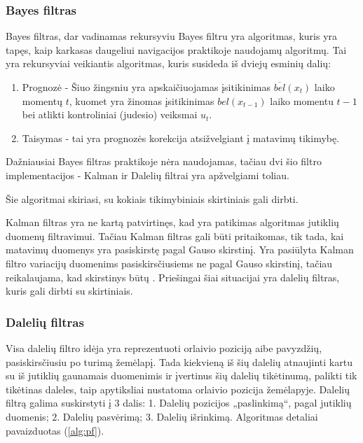 \documentclass[a4paper,12pt]{article}
\begin{document}
		\subsubsection{Bayes filtras}
		\label{sec:BayesFilter}
		
		Bayes filtras, dar vadinamas rekursyviu Bayes filtru yra algoritmas, kuris yra tapęs, kaip karkasas daugeliui navigacijos praktikoje naudojamų algoritmų. 
		Tai yra rekursyviai veikiantis algoritmas, kuris susideda iš dviejų esminių dalių:
		\begin{enumerate}
			\item Prognozė - Šiuo žingsniu yra apskaičiuojamas įsitikinimas $\overline{bel}(x_t)$ laiko momentų $t$, kuomet yra žinomas įsitikinimas $bel(x_{t-1})$ laiko momentu $t-1$ bei atlikti kontroliniai (judesio) veiksmai $u_t$.
			\item Taisymas - tai yra prognozės korekcija atsižvelgiant į matavimų tikimybę.
		\end{enumerate}
		
		Dažniausiai Bayes filtras praktikoje nėra naudojamas, tačiau dvi šio filtro implementacijos - Kalman \cite{siegwart2011introduction, thrun2005probabilistic} ir Dalelių filtrai \cite{Gustafsson2010} yra apžvelgiami toliau.
		
		Šie algoritmai skiriasi, su kokiais tikimybiniais skirtiniais gali dirbti.	
				
		Kalman filtras yra ne kartą patvirtinęs, kad yra patikimas algoritmas jutiklių duomenų filtravimui. Tačiau Kalman filtras gali būti pritaikomas, tik tada, kai matavimų duomenys yra pasiskirstę pagal Gauso skirstinį. Yra pasiūlyta \cite{JulierUhlmann2004} Kalman filtro variacijų duomenims pasiskirsčiusiems ne pagal Gauso skirstinį, tačiau reikalaujama, kad skirstinys būtų . Priešingai šiai situacijai yra dalelių filtras, kuris gali dirbti su  skirtiniais.
				
		\subsubsection{Dalelių filtras}
		\label{sec:ParticleFilter}
		
		Visa dalelių filtro idėja yra reprezentuoti orlaivio poziciją aibe pavyzdžių, pasiskirsčiusiu po turimą žemėlapį. Tada kiekvieną iš šių dalelių atnaujinti kartu su iš jutiklių gaunamais duomenimis ir įvertinus šių dalelių tikėtinumą, palikti tik tikėtinas daleles, taip apytiksliai nustatoma orlaivio pozicija žemėlapyje. Dalelių filtrą galima suskirstyti į 3 dalis: 1. Dalelių pozicijos „paslinkimą“, pagal jutiklių duomenis; 2. Dalelių pasvėrimą; 3. Dalelių išrinkimą. Algoritmas detaliai pavaizduotas (\ref{alg:pf}).		
		
\end{document}
